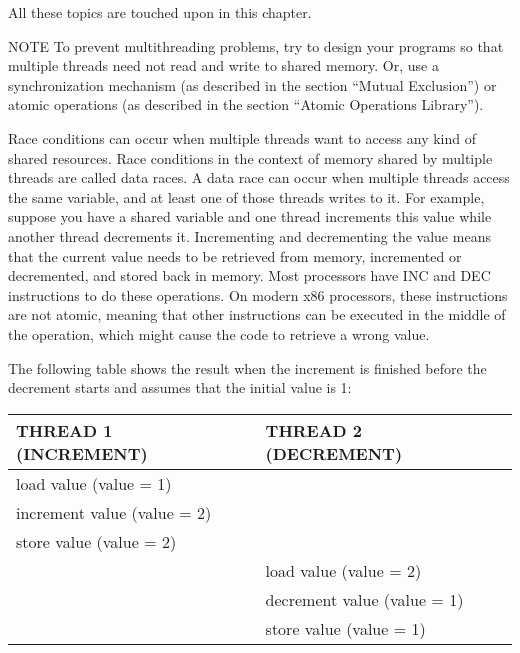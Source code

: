 All these topics are touched upon in this chapter.

\begin{myNotic}{NOTE}
To prevent multithreading problems, try to design your programs so that multiple threads need not read and write to shared memory. Or, use a synchronization mechanism (as described in the section “Mutual Exclusion”) or atomic operations (as described in the section “Atomic Operations Library”).
\end{myNotic}


Race conditions can occur when multiple threads want to access any kind of shared resources. Race conditions in the context of memory shared by multiple threads are called data races. A data race can occur when multiple threads access the same variable, and at least one of those threads writes to it.
For example, suppose you have a shared variable and one thread increments this value while another thread decrements it. Incrementing and decrementing the value means that the current value needs to be retrieved from memory, incremented or decremented, and stored back in memory. Most processors have INC and DEC instructions to do these operations. On modern x86 processors, these instructions are not atomic, meaning that other instructions can be executed in the middle of the operation, which might cause the code to retrieve a wrong value.

The following table shows the result when the increment is finished before the decrement starts and assumes that the initial value is 1:

\begin{longtable}{|l|l|}
\hline
\textbf{THREAD 1 (INCREMENT)} & \textbf{THREAD 2 (DECREMENT)} \\ \hline
\endfirsthead
%
\endhead
%
load value (value = 1)        &                               \\ \hline
increment value (value = 2)   &                               \\ \hline
store value (value = 2)       &                               \\ \hline
& load value (value = 2)        \\ \hline
& decrement value (value = 1)   \\ \hline
& store value (value = 1)       \\ \hline
\end{longtable}

